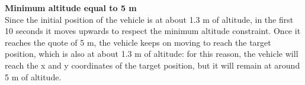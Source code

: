 \documentclass{article}
\begin{document}
{\large \textbf{Minimum altitude equal to 5 m}} \\
Since the initial position of the vehicle is at about 1.3 m of altitude, in the first 10 seconds it moves upwards to respect the minimum altitude constraint. Once it reaches the quote of 5 m, the vehicle keeps on moving to reach the target position, which is also at about 1.3 m of altitude: for this reason, the vehicle will reach the x and y coordinates of the target position, but it will remain at around 5 m of altitude.
\begin{figure}[H]
	\centering
	\hspace{10mm}
	\label{fig:ex1.2.3_case5m_ab}
\end{figure}
\end{document}

